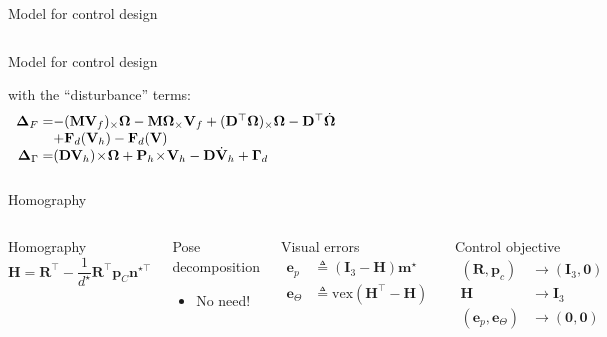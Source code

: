 \documentclass{beamer}
\begin{document}
\begin{frame}{Model for control design}
\begin{columns}
\begin{block}{Model for control design}
		
		\noindent with the ``disturbance'' terms: 
		\[
		\begin{array}{rl}
		\mathbf{\Delta}_F =\!\!\!\!\!\!& -(\mathbf{M}\mathbf{V}_f)_\times \mathbf{\Omega} -\mathbf{M} \mathbf{\Omega}_\times \mathbf{V}_f + (\mathbf{D}^\top \mathbf{\Omega})_\times \mathbf{\Omega} -\mathbf{D}^\top \dot{\mathbf{\Omega}}\\
		&+ \mathbf{F}_d(\mathbf{V}_h) - \mathbf{F}_d(\mathbf{V}) \\
		\mathbf{\Delta}_{\Gamma} =\!\!\!\!\!\! &(\mathbf{DV}_h)\!\times \!\mathbf{\Omega} + \mathbf{P}_h \!\times \!\mathbf{V}_h  - \mathbf{D}\dot{\mathbf{V}}_h  + \mathbf{\Gamma}_d\vspace{-0.1cm}
		\end{array} %
		\]
	\end{block}
\end{columns}
	
\end{frame}


\begin{frame}{Homography}
\begin{columns}
	\begin{block}{Homography}
		\begin{equation*}\label{def:homo}
		\mathbf{H} = \mathbf{R}^{\!\top} - \frac{1}{d^\star} \mathbf{R}^{\!\top} \mathbf{p}_C \mathbf{n}^{\star\!\top} 
		\end{equation*}
	\end{block}
	\begin{block}{Pose decomposition}
		\begin{itemize}
			\item No need!
		\end{itemize}
	\end{block}

	\begin{block}{Visual errors}
		\[
		\begin{array}{rl}
			\mathbf{e}_p &\triangleq (\mathbf{I}_3 - \mathbf{H})\mathbf{m}^\star\\
			\mathbf{e}_\Theta &\triangleq \mathrm{vex}(\mathbf{H}^\top - \mathbf{H}) 
		\end{array}
		\]		
	\end{block}
	\begin{block}{Control objective}
		\[
		\begin{array}{rl}
		(\mathbf{R}, \mathbf{p}_c) & \longrightarrow (\mathbf{I}_3, \mathbf{0})\\
		\mathbf{H} & \longrightarrow \mathbf{I}_3\\
		(\mathbf{e}_p, \mathbf{e}_\Theta) & \longrightarrow (\mathbf{0}, \mathbf{0})
		\end{array}
		\]	
	\end{block}
	
\end{columns}

\end{frame}
\end{document}
